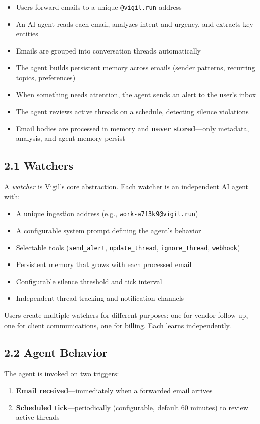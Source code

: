 \documentclass[10pt]{article}
\begin{document}
\begin{itemize}[nosep]
  \item Users forward emails to a unique \texttt{@vigil.run} address
  \item An AI agent reads each email, analyzes intent and urgency, and extracts key entities
  \item Emails are grouped into conversation threads automatically
  \item The agent builds persistent memory across emails (sender patterns, recurring topics, preferences)
  \item When something needs attention, the agent sends an alert to the user's inbox
  \item The agent reviews active threads on a schedule, detecting silence violations
  \item Email bodies are processed in memory and \textbf{never stored}---only metadata, analysis, and agent memory persist
\end{itemize}

\subsection*{2.1 Watchers}
A \emph{watcher} is Vigil's core abstraction. Each watcher is an independent AI agent with:
\begin{itemize}[nosep]
  \item A unique ingestion address (e.g., \texttt{work-a7f3k9@vigil.run})
  \item A configurable system prompt defining the agent's behavior
  \item Selectable tools (\texttt{send\_alert}, \texttt{update\_thread}, \texttt{ignore\_thread}, \texttt{webhook})
  \item Persistent memory that grows with each processed email
  \item Configurable silence threshold and tick interval
  \item Independent thread tracking and notification channels
\end{itemize}

Users create multiple watchers for different purposes: one for vendor follow-up, one for client communications,
one for billing. Each learns independently.

\subsection*{2.2 Agent Behavior}
The agent is invoked on two triggers:
\begin{enumerate}[nosep]
  \item \textbf{Email received}---immediately when a forwarded email arrives
  \item \textbf{Scheduled tick}---periodically (configurable, default 60 minutes) to review active threads
\end{enumerate}
\end{document}
